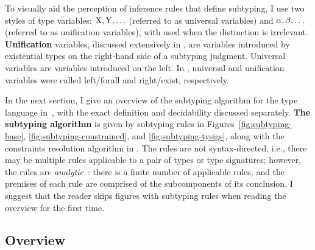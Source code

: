 

To visually aid the perception of inference rules that define subtyping,
I use two styles of type variables: $\mathrm{X}, \mathrm{Y}, \ldots$ (referred to as
universal variables) and $\alpha, \beta, \ldots$ (referred to as unification
variables), with \vany used when the distinction is irrelevant.
\textbf{Unification} variables, discussed extensively
in , are variables introduced by existential
types on the right-hand side of a subtyping judgment.
Universal variables are variables introduced on the left.
In , universal and unification variables
were called left/forall and right/exist, respectively.

In the next section, I give an overview of the subtyping
algorithm for the type language in~,
with the exact definition and decidability discussed separately.
\textbf{The subtyping algorithm} is given by subtyping rules in
Figures~\ref{fig:subtyping-base}, \ref{fig:subtyping-constrained}, and
\ref{fig:subtyping-tysigs},
along with the constraints resolution algorithm in .
The rules are not syntax-directed, i.e., there may be multiple rules
applicable to a pair of types or type signatures; however, the rules
are \emph{analytic}~\cite{bib:martin-lof:analytic-synthetic:1994}:
there is a finite number of applicable rules, and the premises of each rule
are comprised of the subcomponents of its conclusion.
I suggest that the reader skips figures with subtyping rules
when reading the overview for the first time.


\subsection{Overview}

